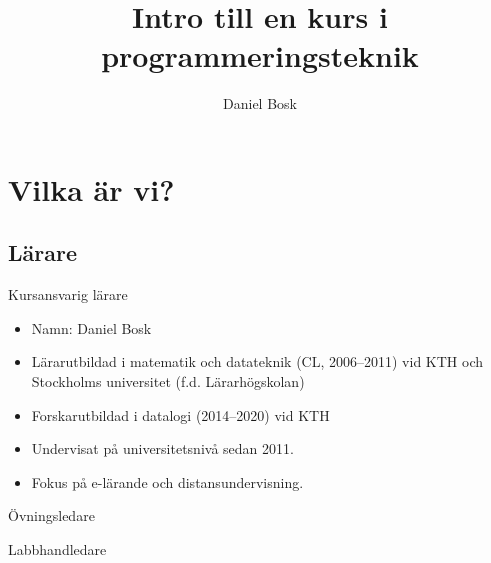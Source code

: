 \title{%
  Intro till en kurs i programmeringsteknik
}
\author{Daniel Bosk}


\mode*

\begin{abstract}
  
\end{abstract}


\section{Vilka är vi?}

\subsection{Lärare}

\begin{frame}
  \begin{block}{Kursansvarig lärare}
    \begin{itemize}
      \item Namn: Daniel Bosk
      \item Lärarutbildad i matematik och datateknik (CL, 2006--2011) vid KTH 
        och Stockholms universitet (f.d. Lärarhögskolan)
      \item Forskarutbildad i datalogi (2014--2020) vid KTH
      \item Undervisat på universitetsnivå sedan 2011.
      \item Fokus på e-lärande och distansundervisning.
    \end{itemize}
  \end{block}
\end{frame}

\begin{frame}
  \begin{center}
    Övningsledare
  \end{center}
\end{frame}

\begin{frame}
  \begin{center}
    Labbhandledare
  \end{center}
\end{frame}

